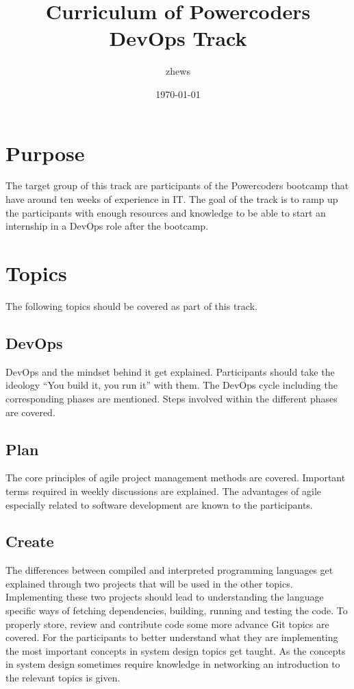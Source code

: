 \documentclass{article}
\title{Curriculum of Powercoders DevOps Track}
\author{zhews}
\date{\today}
\begin{document}
\maketitle
\thispagestyle{empty}

\newpage

\tableofcontents

\newpage

\section{Purpose}

The target group of this track are participants of the Powercoders bootcamp that
have around ten weeks of experience in IT. The goal of the track is to ramp up
the participants with enough resources and knowledge to be able to start an
internship in a DevOps role after the bootcamp.

\section{Topics}

The following topics should be covered as part of this track.

\subsection{DevOps}

DevOps and the mindset behind it get explained. Participants should take the
ideology ``You build it, you run it'' with them. The DevOps cycle including the
corresponding phases are mentioned. Steps involved within the different phases
are covered.

\subsection{Plan}

The core principles of agile project management methods are covered. Important
terms required in weekly discussions are explained. The advantages of agile
especially related to software development are known to the participants.

\subsection{Create}

The differences between compiled and interpreted programming languages get
explained through two projects that will be used in the other topics.
Implementing these two projects should lead to understanding the language
specific ways of fetching dependencies, building, running and testing the code.
To properly store, review and contribute code some more advance Git topics are
covered. For the participants to better understand what they are implementing
the most important concepts in system design topics get taught. As the concepts
in system design sometimes require knowledge in networking an introduction to
the relevant topics is given.
\end{document}
